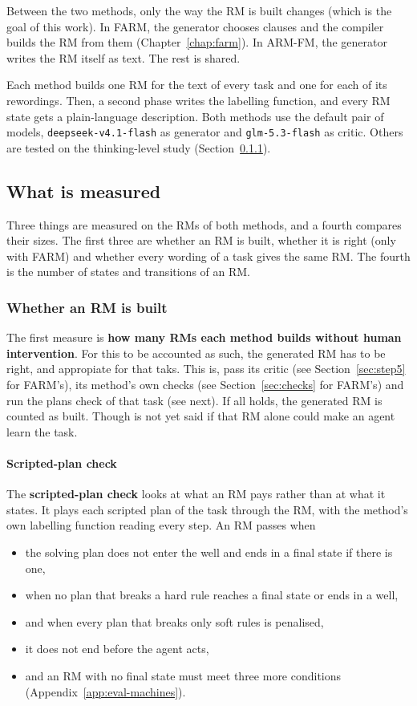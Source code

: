 \documentclass[11pt,english,listoffigures,listoftables]{tfgetsinf}
\begin{document}
Between the two methods, only the way the RM is built changes (which is the goal of this work). In FARM, the generator chooses clauses and the compiler builds the RM from them (Chapter~\ref{chap:farm}). In ARM-FM, the generator writes the RM itself as text. The rest is shared. 

Each method builds one RM for the text of every task and one for each of its rewordings. Then, a second phase writes the labelling function, and every RM state gets a plain-language description. Both methods use the default pair of models, \texttt{deepseek-v4.1-flash} as generator and \texttt{glm-5.3-flash} as critic. Others are tested on the thinking-level study (Section~\ref{sec:eval-built}).


\subsection{What is measured}
Three things are measured on the RMs of both methods, and a fourth compares their sizes. The first three are whether an RM is built, whether it is right (only with FARM) and whether every wording of a task gives the same RM. The fourth is the number of states and transitions of an RM.


\subsubsection{Whether an RM is built}
\label{sec:eval-built}The first measure is \textbf{how many RMs each method builds without human intervention}. For this to be accounted as such, the generated RM has to be right, and appropiate for that taks. This is, pass its critic (see Section~\ref{sec:step5} for FARM's), its method's own checks (see Section~\ref{sec:checks} for FARM's) and run the plans check of that task (see next). If all holds, the generated RM is counted as built. Though is not yet said if that RM alone could make an agent learn the task.

\label{sec:eval-plan-check}\paragraph{Scripted-plan check} The \textbf{scripted-plan check} looks at what an RM pays rather than at what it states. It plays each scripted plan of the task through the RM, with the method's own labelling function reading every step. An RM passes when 
\begin{itemize}
    \item the solving plan does not enter the well and ends in a final state if there is one,
    \item when no plan that breaks a hard rule reaches a final state or ends in a well,
    \item and when every plan that breaks only soft rules is penalised,
    \item it does not end before the agent acts,
    \item and an RM with no final state must meet three more conditions (Appendix~\ref{app:eval-machines}).
\end{itemize}
\end{document}
